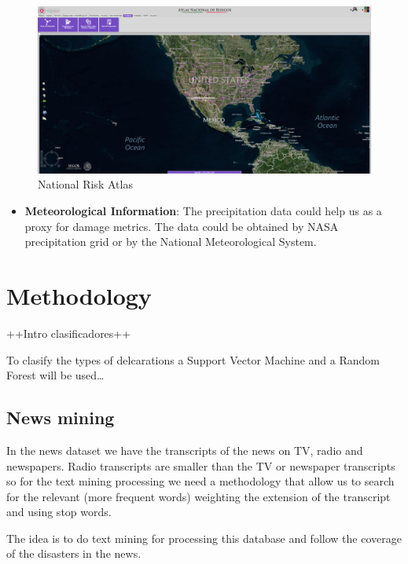 \documentclass[]{article}
\begin{document}
\begin{figure}[htbp]
\centering
\includegraphics{img/anr.png}
\caption{National Risk Atlas}
\end{figure}

\begin{itemize}
\itemsep1pt\parskip0pt
\item
  \textbf{Meteorological Information}: The precipitation data could help
  us as a proxy for damage metrics. The data could be obtained by NASA
  precipitation grid or by the National Meteorological System.
\end{itemize}

\section{Methodology}\label{methodology}

++Intro clasificadores++

To clasify the types of delcarations a Support Vector Machine and a
Random Forest will be used\ldots{}

\subsection{News mining}\label{news-mining}

In the news dataset we have the transcripts of the news on TV, radio and
newspapers. Radio transcripts are smaller than the TV or newspaper
transcripts so for the text mining processing we need a methodology that
allow us to search for the relevant (more frequent words) weighting the
extension of the transcript and using stop words.

The idea is to do text mining for processing this database and follow
the coverage of the disasters in the news.
\end{document}
